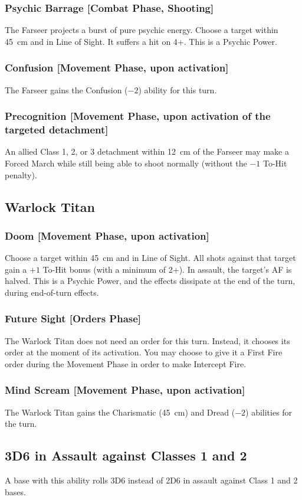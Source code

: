 \subsubsection{Psychic Barrage [Combat Phase, Shooting]}

The Farseer projects a burst of pure psychic energy. Choose a target within 45~cm and in Line of Sight. It suffers a hit on 4+. This is a Psychic Power.

\subsubsection{Confusion [Movement Phase, upon activation]}

The Farseer gains the Confusion ($-2$) ability for this turn.

\subsubsection{Precognition [Movement Phase, upon activation of the targeted detachment]}

An allied Class 1, 2, or 3 detachment within 12~cm of the Farseer may make a Forced March while still being able to shoot normally (without the $-1$ To-Hit penalty).

\subsection{Warlock Titan}

\subsubsection{Doom [Movement Phase, upon activation]}

Choose a target within 45~cm and in Line of Sight. All shots against that target gain a $+1$ To-Hit bonus (with a minimum of 2+). In assault, the target's AF is halved. This is a Psychic Power, and the effects dissipate at the end of the turn, during end-of-turn effects.

\subsubsection{Future Sight [Orders Phase]}

The Warlock Titan does not need an order for this turn. Instead, it chooses its order at the moment of its activation. You may choose to give it a First Fire order during the Movement Phase in order to make Intercept Fire.

\subsubsection{Mind Scream [Movement Phase, upon activation]}

The Warlock Titan gains the Charismatic (45~cm) and Dread ($-2$) abilities for the turn.

\subsection{3D6 in Assault against Classes 1 and 2}

A base with this ability rolls 3D6 instead of 2D6 in assault against Class 1 and 2 bases.
